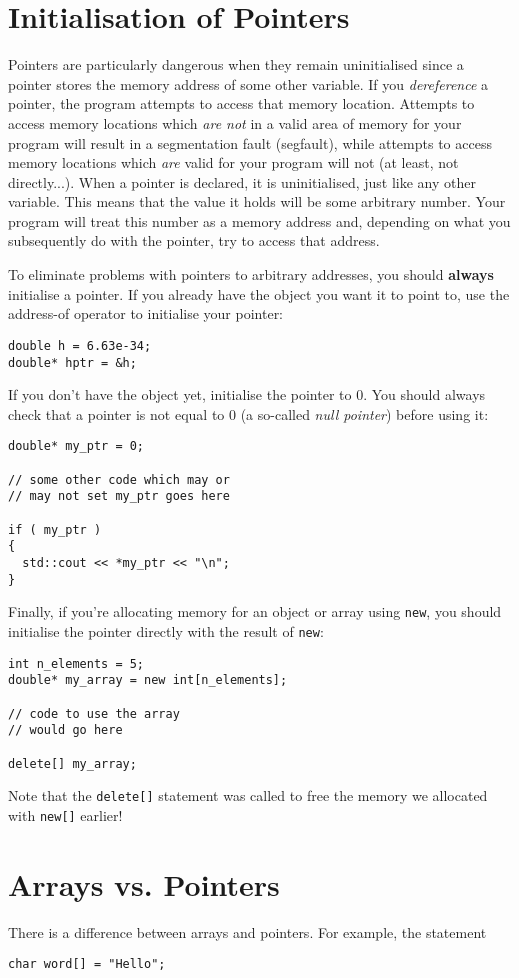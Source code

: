 \documentclass[a4paper]{scrartcl}
\begin{document}
\section{Initialisation of Pointers}
Pointers are particularly dangerous when they remain uninitialised since a pointer stores the memory address of some other variable. If you \emph{dereference} a pointer, the program attempts to access that memory location. Attempts to access memory locations which \emph{are not} in a valid area of memory for your program will result in a segmentation fault (segfault), while attempts to access memory locations which \emph{are} valid for your program will not (at least, not directly...). When a pointer is declared, it is uninitialised, just like any other variable. This means that the value it holds will be some arbitrary number. Your program will treat this number as a memory address and, depending on what you subsequently do with the pointer, try to access that address.

To eliminate problems with pointers to arbitrary addresses, you should \textbf{always} initialise a pointer. If you already have the object you want it to point to, use the address-of operator to initialise your pointer:
\begin{verbatim}
double h = 6.63e-34;
double* hptr = &h;
\end{verbatim}

If you don't have the object yet, initialise the pointer to 0. You should always check that a pointer is not equal to 0 (a so-called \emph{null pointer}) before using it:
\begin{verbatim}
double* my_ptr = 0;

// some other code which may or 
// may not set my_ptr goes here

if ( my_ptr )
{
  std::cout << *my_ptr << "\n";
}
\end{verbatim}

Finally, if you're allocating memory for an object or array using \texttt{new}, you should initialise the pointer directly with the result of \texttt{new}:
\begin{verbatim}
int n_elements = 5;
double* my_array = new int[n_elements];

// code to use the array
// would go here

delete[] my_array;
\end{verbatim}
Note that the \verb|delete[]| statement was called to free the memory we allocated with \verb|new[]| earlier!

\section{Arrays vs. Pointers}
There is a difference between arrays and pointers. For example, the statement
\begin{verbatim}
char word[] = "Hello";
\end{verbatim}
\end{document}
